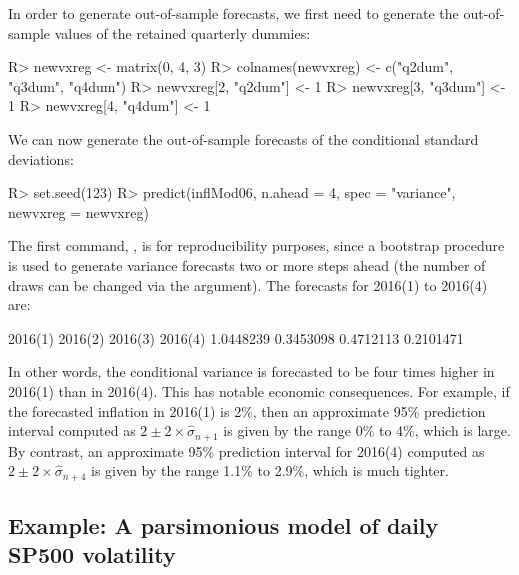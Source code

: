 \documentclass[article,nojss]{jss}
\begin{document}
%
In order to generate out-of-sample forecasts, we first need to generate the out-of-sample values of the retained quarterly dummies:
%
\begin{CodeChunk}
\begin{CodeInput}
R> newvxreg <- matrix(0, 4, 3)
R> colnames(newvxreg) <- c("q2dum", "q3dum", "q4dum")
R> newvxreg[2, "q2dum"] <- 1
R> newvxreg[3, "q3dum"] <- 1
R> newvxreg[4, "q4dum"] <- 1
\end{CodeInput}
\end{CodeChunk}
%
We can now generate the out-of-sample forecasts of the conditional standard deviations:
%
\begin{CodeChunk}
\begin{CodeInput}
R> set.seed(123)
R> predict(inflMod06, n.ahead = 4, spec = "variance", newvxreg = newvxreg)
\end{CodeInput}
\end{CodeChunk}
%
The first command, , is for reproducibility
purposes, since a bootstrap procedure is used to generate variance
forecasts two or more steps ahead (the number of draws can be changed
via the  argument). The forecasts for 2016(1) to 2016(4)
are:
%
\begin{CodeChunk}
\begin{CodeOutput}
  2016(1)   2016(2)   2016(3)   2016(4) 
1.0448239 0.3453098 0.4712113 0.2101471 
\end{CodeOutput}
\end{CodeChunk}
%
In other words, the conditional variance is forecasted to be four times higher in 2016(1) than in 2016(4). This has notable economic consequences. For example, if the forecasted inflation in 2016(1) is 2\%, then an approximate 95\% prediction interval computed as $2 \pm 2 \times \widehat{\sigma}_{n+1}$ is given by the range $0$\% to 4\%, which is large. By contrast, an approximate 95\% prediction interval for 2016(4) computed as $2 \pm 2 \times \widehat{\sigma}_{n+4}$ is given by the range 1.1\% to 2.9\%, which is much tighter.

\newpage
\subsection{Example: A parsimonious model of daily SP500 volatility}
\label{subsec:gets:sp500:example}
\end{document}
